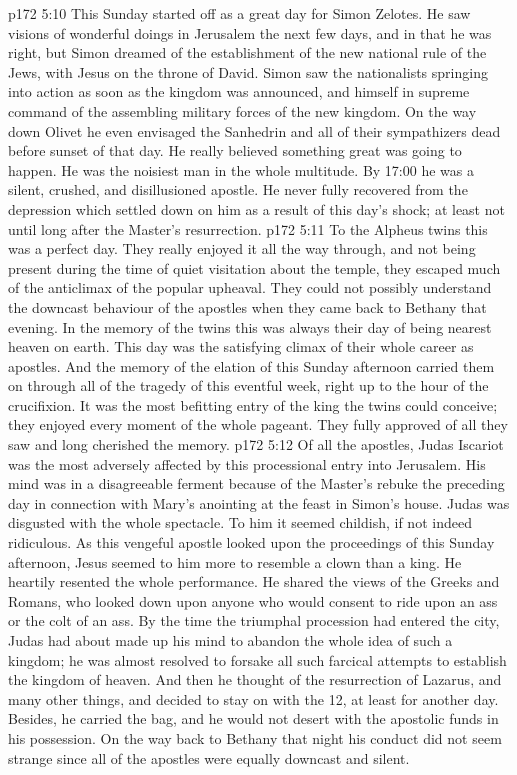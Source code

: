\vs p172 5:10 This Sunday started off as a great day for Simon Zelotes. He saw visions of wonderful doings in Jerusalem the next few days, and in that he was right, but Simon dreamed of the establishment of the new national rule of the Jews, with Jesus on the throne of David. Simon saw the nationalists springing into action as soon as the kingdom was announced, and himself in supreme command of the assembling military forces of the new kingdom. On the way down Olivet he even envisaged the Sanhedrin and all of their sympathizers dead before sunset of that day. He really believed something great was going to happen. He was the noisiest man in the whole multitude. By 17:00 he was a silent, crushed, and disillusioned apostle. He never fully recovered from the depression which settled down on him as a result of this day’s shock; at least not until long after the Master’s resurrection.
\vs p172 5:11 To the Alpheus twins this was a perfect day. They really enjoyed it all the way through, and not being present during the time of quiet visitation about the temple, they escaped much of the anticlimax of the popular upheaval. They could not possibly understand the downcast behaviour of the apostles when they came back to Bethany that evening. In the memory of the twins this was always their day of being nearest heaven on earth. This day was the satisfying climax of their whole career as apostles. And the memory of the elation of this Sunday afternoon carried them on through all of the tragedy of this eventful week, right up to the hour of the crucifixion. It was the most befitting entry of the king the twins could conceive; they enjoyed every moment of the whole pageant. They fully approved of all they saw and long cherished the memory.
\vs p172 5:12 Of all the apostles, Judas Iscariot was the most adversely affected by this processional entry into Jerusalem. His mind was in a disagreeable ferment because of the Master’s rebuke the preceding day in connection with Mary’s anointing at the feast in Simon’s house. Judas was disgusted with the whole spectacle. To him it seemed childish, if not indeed ridiculous. As this vengeful apostle looked upon the proceedings of this Sunday afternoon, Jesus seemed to him more to resemble a clown than a king. He heartily resented the whole performance. He shared the views of the Greeks and Romans, who looked down upon anyone who would consent to ride upon an ass or the colt of an ass. By the time the triumphal procession had entered the city, Judas had about made up his mind to abandon the whole idea of such a kingdom; he was almost resolved to forsake all such farcical attempts to establish the kingdom of heaven. And then he thought of the resurrection of Lazarus, and many other things, and decided to stay on with the 12, at least for another day. Besides, he carried the bag, and he would not desert with the apostolic funds in his possession. On the way back to Bethany that night his conduct did not seem strange since all of the apostles were equally downcast and silent.

